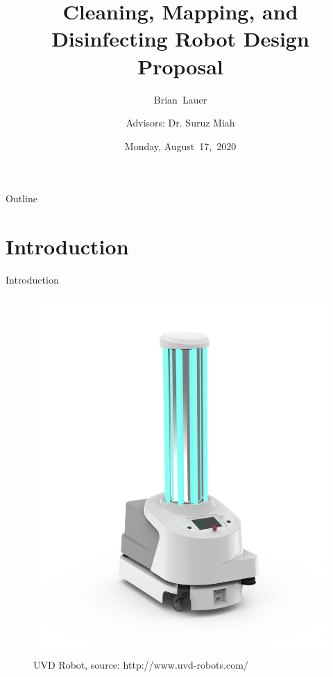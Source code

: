 \documentclass{beamer}
\title[Design Proposal]{Cleaning, Mapping, and Disinfecting Robot Design Proposal}
\author[B.~Lauer]{Brian~Lauer\\\and
Advisors: Dr. Suruz Miah}
\institute[Bradley University] %
{
  Department of Electrical and Computer Engineering\\
  Bradley University\\
  1501 W. Bradley Avenue\\
  Peoria, IL, 61625, USA
}
\date[August~17,~2020]{Monday, August~17,~2020}
\begin{document}
\begin{frame}
  \titlepage
\end{frame}

\begin{frame}{Outline}
  \tableofcontents
\end{frame}

\section{Introduction}
\begin{frame}{Introduction}{}
\begin{figure}
	\centering
	\includegraphics[scale=0.2]{figs/img/UVDR-front}
	\caption{UVD Robot, source: http://www.uvd-robots.com/}
\end{figure}
\end{frame}
\end{document}
